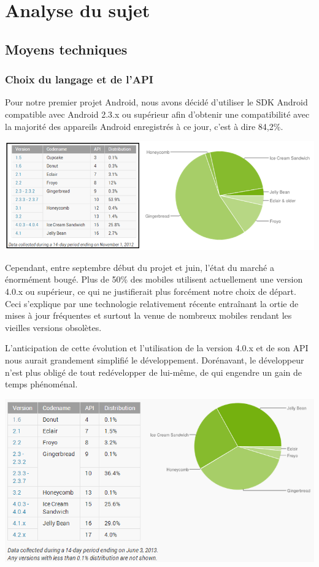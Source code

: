 \documentclass{report}
\begin{document}
\newpage

\section{Analyse du sujet}
\bigskip


\subsection{Moyens techniques}
\bigskip


\subsubsection{Choix du langage et de l'API}

Pour notre premier projet Android, nous avons décidé d’utiliser le SDK
Android compatible avec Android 2.3.x ou supérieur afin d’obtenir une
compatibilité avec la majorité des appareils Android enregistrés à ce
jour, c’est à dire 84,2\%.

\includegraphics[scale=0.75]{images/graph1}

Cependant, entre septembre début du projet et juin, l’état du marché a
énormément bougé.
Plus de 50\% des mobiles utilisent actuellement une version 4.0.x ou
supérieur, ce qui ne justifierait plus forcément notre choix de départ.
Ceci s’explique par une technologie relativement récente entraînant la
ortie de mises à jour fréquentes et surtout la venue de nombreux mobiles
rendant les vieilles versions obsolètes.

L’anticipation de cette évolution et l’utilisation de la version 4.0.x
et de son API nous aurait grandement simplifié le développement.
Dorénavant, le développeur n’est plus obligé de tout redévelopper de
lui-même, de qui engendre un gain de temps phénoménal.
\bigskip


\includegraphics[scale=0.75]{images/graph2}
\end{document}
